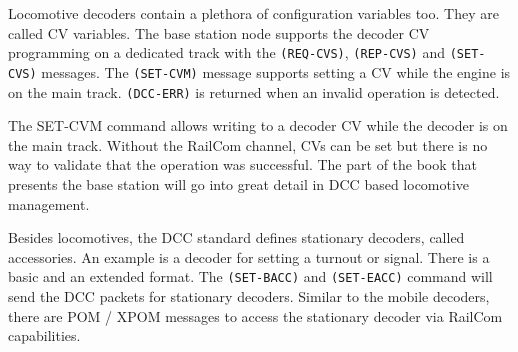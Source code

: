 Locomotive decoders contain a plethora of configuration variables too. They are called CV variables. The base station node supports the decoder CV programming on a dedicated track with the \texttt{(REQ-CVS)}, \texttt{(REP-CVS)} and \texttt{(SET-CVS)} messages. The \texttt{(SET-CVM)} message supports setting a CV while the engine is on the main track. \texttt{(DCC-ERR)} is returned when an invalid operation is detected.

\begin{table}[ht!]
    \centering 
\end{table}

The SET-CVM command allows writing to a decoder CV while the decoder is on the main track. Without the RailCom channel, CVs can be set but there is no way to validate that the operation was successful. The part of the book that presents the base station will go into great detail in DCC based locomotive management.


Besides locomotives, the DCC standard defines stationary decoders, called accessories. An example is a decoder for setting a turnout or signal. There is a basic and an extended format. The \texttt{(SET-BACC)} and \texttt{(SET-EACC)} command will send the DCC packets for stationary decoders. Similar to the mobile decoders, there are POM / XPOM messages to access the stationary decoder via RailCom capabilities.

\begin{table}[ht!]
    \centering 
\end{table}

